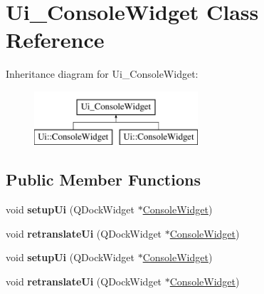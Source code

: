 \hypertarget{class_ui___console_widget}{\section{\-Ui\-\_\-\-Console\-Widget \-Class \-Reference}
\label{class_ui___console_widget}
}
\-Inheritance diagram for \-Ui\-\_\-\-Console\-Widget\-:\begin{figure}[H]
\begin{center}
\leavevmode
\includegraphics[height=2.000000cm]{class_ui___console_widget}
\end{center}
\end{figure}
\subsection*{\-Public \-Member \-Functions}
\begin{DoxyCompactItemize}
\item 
\hypertarget{class_ui___console_widget_aa2017378701da025751fb17393bbaa28}{void {\bfseries setup\-Ui} (\-Q\-Dock\-Widget $\ast$\hyperlink{class_console_widget}{\-Console\-Widget})}\label{class_ui___console_widget_aa2017378701da025751fb17393bbaa28}

\item 
\hypertarget{class_ui___console_widget_a314a81ccf971c510092f296d61037038}{void {\bfseries retranslate\-Ui} (\-Q\-Dock\-Widget $\ast$\hyperlink{class_console_widget}{\-Console\-Widget})}\label{class_ui___console_widget_a314a81ccf971c510092f296d61037038}

\item 
\hypertarget{class_ui___console_widget_aa2017378701da025751fb17393bbaa28}{void {\bfseries setup\-Ui} (\-Q\-Dock\-Widget $\ast$\hyperlink{class_console_widget}{\-Console\-Widget})}\label{class_ui___console_widget_aa2017378701da025751fb17393bbaa28}

\item 
\hypertarget{class_ui___console_widget_a314a81ccf971c510092f296d61037038}{void {\bfseries retranslate\-Ui} (\-Q\-Dock\-Widget $\ast$\hyperlink{class_console_widget}{\-Console\-Widget})}\label{class_ui___console_widget_a314a81ccf971c510092f296d61037038}

\end{DoxyCompactItemize}

